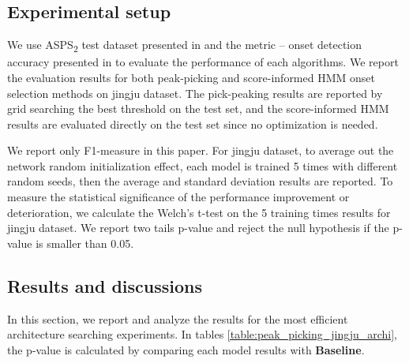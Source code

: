 \subsection{Experimental setup}\label{sec:ch5:eval_improving} 

We use ASPS\textsubscript{2} test dataset presented in  and the metric -- onset detection accuracy presented in  to evaluate the performance of each algorithms. We report the evaluation results for both peak-picking and score-informed HMM onset selection methods on jingju dataset. The pick-peaking results are reported by grid searching the best threshold on the test set, and the score-informed HMM results are evaluated directly on the test set since no optimization is needed.

We report only F1-measure in this paper. 
For jingju dataset, to average out the network random initialization effect, each model is trained 5 times with different random seeds, then the average and standard deviation results are reported. To measure the statistical significance of the performance improvement or deterioration, we calculate the Welch's t-test on the 5 training times results for jingju dataset. We report two tails p-value and reject the null hypothesis if the p-value is smaller than 0.05.

\subsection{Results and discussions}

In this section, we report and analyze the results for the most efficient architecture searching experiments. In tables \ref{table:peak_picking_jingju_archi}, the p-value is calculated by comparing each model results with \textbf{Baseline}.

